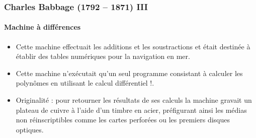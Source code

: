 \documentclass[utf8,10pt]{beamer}
\begin{document}
\begin{frame}
    \frametitle{Charles Babbage (1792 -- 1871) III}
    \framesubtitle{Machine à différences}
    
    \begin{itemize}
        \item Cette machine effectuait les additions et 
        les soustractions et était destinée à établir des tables numériques pour la 
        navigation en mer. 
        
        \item Cette machine n'exécutait qu'un seul programme consistant à 
        \og calculer les polynômes en utilisant le calcul différentiel !\fg.
        
        \item \alert{Originalité} : pour retourner les résultats de ses calculs la machine gravait 
        un plateau de cuivre à
        l'aide d'un timbre en acier, préfigurant ainsi les médias non réinscriptibles comme les 
        cartes perforées ou les premiers disques optiques. 
    \end{itemize}

\end{frame}
\end{document}
